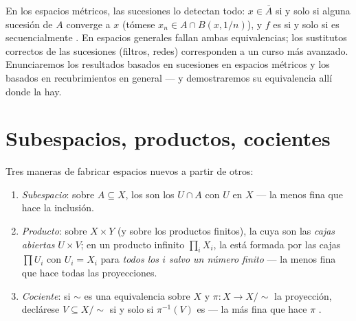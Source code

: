 \begin{remark}\label{rem:b3:topology:sequences}
En los espacios métricos, las sucesiones lo detectan todo:
$x \in \bar A$ si y solo si alguna sucesión de $A$ converge a $x$
(tómese $x_n \in A \cap
B(x, 1/n)$), y $f$ es  si y
solo si es secuencialmente
. En espacios generales
fallan ambas equivalencias; los sustitutos correctos de las sucesiones
(filtros, redes) corresponden a un curso más avanzado. Enunciaremos los
resultados basados en sucesiones en espacios métricos y los basados en
recubrimientos en general --- y demostraremos su equivalencia allí donde
la hay.
\end{remark}

\section{Subespacios, productos, cocientes}

\begin{definition}\label{def:b3:topology:constructions}
Tres maneras de fabricar espacios nuevos a partir de
otros:
\begin{enumerate}
  \item \emph{Subespacio}: sobre $A \subseteq X$, los
   son los $U \cap A$ con $U$
   en $X$ --- la 
  menos fina que hace  la
  inclusión. \item \emph{Producto}: sobre $X \times Y$ (y sobre los
  productos finitos), la 
  cuya  son las \emph{cajas
  abiertas} $U \times
        V$; en un producto infinito $\prod_i X_i$, la
   está formada por las cajas
  $\prod U_i$ con $U_i = X_i$ para \emph{todos los $i$ salvo un número
  finito} --- la  menos fina
  que hace  todas las
  proyecciones. \item \emph{Cociente}: si $\sim$ es una equivalencia
  sobre $X$ y $\pi\colon X \to X/{\sim}$ la proyección, declárese $V
        \subseteq X/{\sim}$  si y solo si $\pi^{-1}(V)$ es
   --- la  más fina
  que hace $\pi$ .
\end{enumerate}
\end{definition}

